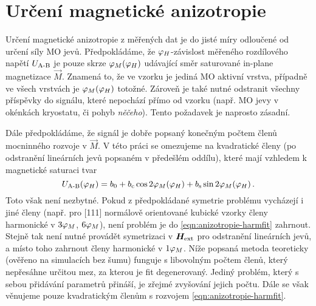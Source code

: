 \section{Určení magnetické anizotropie}
\label{chap:urceni-magneticke-anizotropie}

Určení magnetické anizotropie z měřených dat je do jisté míry odloučené od určení síly MO jevů.
Předpokládáme, že $\varphi_H$-závislost měřeného rozdílového napětí $U_\textrm{A-B}$ je pouze skrze $\varphi_M(\varphi_H)$ udávající směr saturované in-plane magnetizace $\vec{M}$.
Znamená to, že ve vzorku je jediná MO aktivní vrstva, případně ve všech vrstvách je $\varphi_M(\varphi_H)$ totožné.
Zároveň je také nutné odstranit všechny příspěvky do signálu, které nepochází přímo od vzorku (např. MO jevy v okénkách kryostatu, či pohyb \emph{něčeho}).
Tento požadavek je naprosto zásadní.

Dále předpokládáme, že signál je dobře popsaný konečným počtem členů mocninného rozvoje v $\vec{M}$.
V této práci se omezujeme na kvadratické členy (po odstranění lineárních jevů popsaném v předešlém oddílu), které mají vzhledem k magnetické saturaci tvar
\begin{equation}
\label{eqn:anizotropie-harmfit}
    U_\textrm{A-B}(\varphi_H) = b_0 + b_\textrm{c} \cos2\varphi_M(\varphi_H) + b_\textrm{s} \sin2\varphi_M(\varphi_H) \,.
\end{equation}
Toto však není nezbytné.
Pokud z předpokládané symetrie problému vycházejí i jiné členy (např. pro [111] normálově orientované kubické vzorky členy harmonické v $3\varphi_M$, $6\varphi_M$), není problém je do \eqref{eqn:anizotropie-harmfit} zahrnout.
Stejně tak není nutné provádět symetrizaci v $\bm{H}_\textrm{ext}$ pro odstranění lineárních jevů, a místo toho zahrnout členy harmonické v $1\varphi_M$.
Níže popsaná metoda teoreticky (ověřeno na simulacích bez šumu) funguje s libovolným počtem členů, který nepřesáhne určitou mez, za kterou je fit degenerovaný.
Jediný problém, který s sebou přidávání parametrů přináší, je zřejmé zvyšování jejich počtu.
Dále se však věnujeme pouze kvadratickým členům s rozvojem \eqref{eqn:anizotropie-harmfit}.

